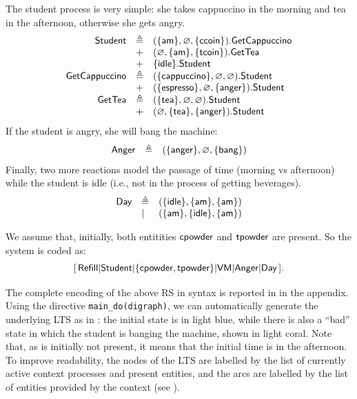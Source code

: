 The student process is very simple: she takes cappuccino in the morning and tea in the afternoon, otherwise she gets angry.
\[
\begin{array}{rll}
\mathsf{Student} & \triangleq & (\{{\text{\sffamily am}}\},\varnothing,\{{\text{\sffamily ccoin}}\}).\mathsf{GetCappuccino}\\
& + & (\varnothing,\{{\text{\sffamily am}}\},\{{\text{\sffamily tcoin}}\}).\mathsf{GetTea}\\
& + & \{{\text{\sffamily idle}}\}.\mathsf{Student}\\
\mathsf{GetCappuccino} & \triangleq & (\{{\text{\sffamily cappuccino}}\},\varnothing,\varnothing).\mathsf{Student}\\
& + & (\{{\text{\sffamily espresso}}\},\varnothing,\{{\text{\sffamily anger}}\}).\mathsf{Student}\\
\mathsf{GetTea} & \triangleq & (\{{\text{\sffamily tea}}\},\varnothing,\varnothing).\mathsf{Student}\\
& + & (\varnothing,\{{\text{\sffamily tea}}\},\{{\text{\sffamily anger}}\}).\mathsf{Student}\\
\end{array}
\]
If the student is angry, she will bang the machine:
\[
\begin{array}{lll}
\mathsf{Anger} & \triangleq & (\{{\text{\sffamily anger}}\},\varnothing,\{{\text{\sffamily bang}}\})
\end{array}
\]
Finally, two more reactions model the passage of time (morning vs afternoon) while the student is idle (i.e., not in the process of getting beverages).
\[
\begin{array}{lll}
\mathsf{Day} & \triangleq & (\{{\text{\sffamily idle}}\},\{{\text{\sffamily am}}\},\{{\text{\sffamily am}}\})\\
& | & (\{{\text{\sffamily am}}\},\{{\text{\sffamily idle}}\},\{{\text{\sffamily am}}\})
\end{array}
\]

We assume that, initially, both entitities ${\text{\sffamily cpowder}}$ and ${\text{\sffamily tpowder}}$ are present.
So the system is coded as:
\[
[\,\mathsf{Refill}
| \mathsf{Student}
| \{{\text{\sffamily cpowder}},{\text{\sffamily tpowder}}\} 
| \mathsf{VM}
| \mathsf{Anger}
| \mathsf{Day}\,] .
\]

The complete encoding of the above RS in \BioResolve syntax is reported in  in the appendix.
Using the \BioResolve directive \verb=main_do(digraph)=, we can automatically generate the underlying LTS as in : the initial state is in light blue, while there is also a ``bad'' state in which the student is banging the machine, shown in light coral.
Note that, as \am is initially not present, it means that the initial time is in the afternoon.
To improve readability, the nodes of the LTS are labelled by the list of currently active context processes and present entities, and the arcs are labelled by the list of entities provided by the context (see ).


